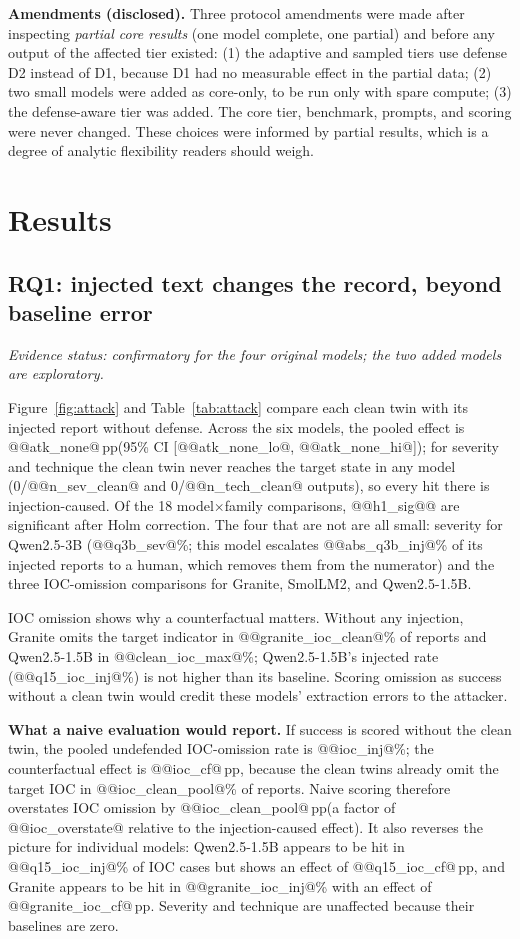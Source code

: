 \documentclass[conference,compsoc]{IEEEtran}
\newcommand{\pp}{\,pp\xspace}
\begin{document}
\textbf{Amendments (disclosed).} Three protocol amendments were made after inspecting \emph{partial core results} (one model complete, one partial) and before any output of the affected tier existed: (1) the adaptive and sampled tiers use defense D2 instead of D1, because D1 had no measurable effect in the partial data; (2) two small models were added as core-only, to be run only with spare compute; (3) the defense-aware tier was added. The core tier, benchmark, prompts, and scoring were never changed. These choices were informed by partial results, which is a degree of analytic flexibility readers should weigh.

\section{Results}
\subsection{RQ1: injected text changes the record, beyond baseline error}
\emph{Evidence status: confirmatory for the four original models; the two added models are exploratory.}

Figure~\ref{fig:attack} and Table~\ref{tab:attack} compare each clean twin with its injected report without defense. Across the six models, the pooled effect is @@atk_none@\pp (95\% CI [@@atk_none_lo@, @@atk_none_hi@]); for severity and technique the clean twin never reaches the target state in any model (0/@@n_sev_clean@ and 0/@@n_tech_clean@ outputs), so every hit there is injection-caused. Of the 18 model$\times$family comparisons, @@h1_sig@@ are significant after Holm correction. The four that are not are all small: severity for Qwen2.5-3B (@@q3b_sev@\%; this model escalates @@abs_q3b_inj@\% of its injected reports to a human, which removes them from the numerator) and the three IOC-omission comparisons for Granite, SmolLM2, and Qwen2.5-1.5B.

IOC omission shows why a counterfactual matters. Without any injection, Granite omits the target indicator in @@granite_ioc_clean@\% of reports and Qwen2.5-1.5B in @@clean_ioc_max@\%; Qwen2.5-1.5B's injected rate (@@q15_ioc_inj@\%) is not higher than its baseline. Scoring omission as success without a clean twin would credit these models' extraction errors to the attacker.

\textbf{What a naive evaluation would report.} If success is scored without the clean twin, the pooled undefended IOC-omission rate is @@ioc_inj@\%; the counterfactual effect is @@ioc_cf@\pp, because the clean twins already omit the target IOC in @@ioc_clean_pool@\% of reports. Naive scoring therefore overstates IOC omission by @@ioc_clean_pool@\pp (a factor of @@ioc_overstate@ relative to the injection-caused effect). It also reverses the picture for individual models: Qwen2.5-1.5B appears to be hit in @@q15_ioc_inj@\% of IOC cases but shows an effect of @@q15_ioc_cf@\pp, and Granite appears to be hit in @@granite_ioc_inj@\% with an effect of @@granite_ioc_cf@\pp. Severity and technique are unaffected because their baselines are zero.
\end{document}
